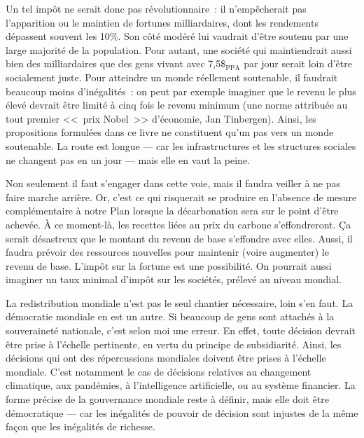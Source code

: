 \documentclass[a5paper,french]{memoir}
\begin{document}
Un tel impôt ne serait donc pas révolutionnaire~: il n'empêcherait pas l'apparition ou le maintien de fortunes milliardaires, dont les rendements dépassent souvent les 10\%. %
Son côté modéré lui vaudrait d'être soutenu par une large majorité de la population. Pour autant, une société qui maintiendrait aussi bien des milliardaires que des gens vivant avec 7,5\$$_\text{PPA}$ par jour serait loin d'être socialement juste. Pour atteindre un monde réellement soutenable, il faudrait beaucoup moins d'inégalités~: %
on peut par exemple imaginer que le revenu le plus élevé devrait être limité à cinq fois le revenu minimum (une norme attribuée au tout premier <<~prix Nobel~>> d'économie, Jan Tinbergen). Ainsi, les propositions formulées dans ce livre ne constituent qu'un pas vers un monde soutenable. La route est longue --- car les infrastructures et les structures sociales ne changent pas en un jour --- mais elle en vaut la peine.  

Non seulement il faut s'engager dans cette voie, mais il faudra veiller à ne pas faire marche arrière. Or, c'est ce qui risquerait se produire en l'absence de mesure complémentaire à notre Plan lorsque la décarbonation sera sur le point d'être achevée. À ce moment-là, les recettes liées au prix du carbone s'effondreront. Ça serait désastreux que le montant du revenu de base s'effondre avec elles. Aussi, il faudra prévoir des ressources nouvelles pour maintenir (voire augmenter) le revenu de base. L'impôt sur la fortune est une possibilité. On pourrait aussi imaginer un taux minimal d'impôt sur les sociétés, prélevé au niveau mondial. 

La redistribution mondiale n'est pas le seul chantier nécessaire, loin s'en faut. La démocratie mondiale en est un autre. Si beaucoup de gens sont attachés à la souveraineté nationale, c'est selon moi une erreur. En effet, toute décision devrait être prise à l'échelle pertinente, en vertu du principe de subsidiarité. Ainsi, les décisions qui ont des répercussions mondiales doivent être prises à l'échelle mondiale. C'est notamment le cas de décisions relatives au changement climatique, aux pandémies, à l'intelligence artificielle, ou au système financier. %
La forme précise de la gouvernance mondiale reste à définir, mais elle doit être démocratique --- car les inégalités de pouvoir de décision sont injustes de la même façon que les inégalités de richesse. %
\end{document}
